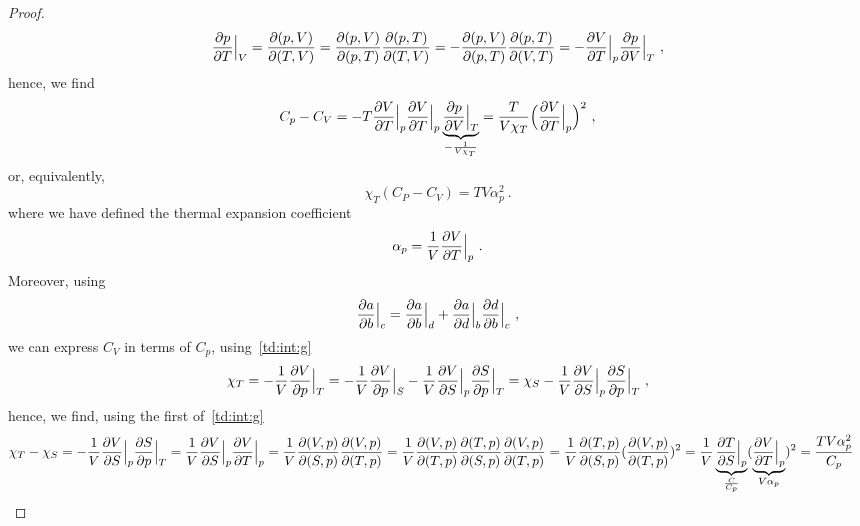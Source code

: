 \begin{proof}
\begin{equation*}
            \frac{\partial p}{\partial T} \Big \vert_V = \frac{\partial(p, V)}{\partial(T, V)} = \frac{\partial(p,V)}{\partial(p, T)} \frac{\partial(p, T)}{\partial(T, V)} = - \frac{\partial(p,V)}{\partial(p, T)} \frac{\partial(p, T)}{\partial(V, T)} = - \frac{\partial V}{\partial T} \Big \vert_p \frac{\partial p}{\partial V} \Big \vert_T ~,
        \end{equation*}
        hence, we find
        \begin{equation*}
            C_p - C_V = - T \frac{\partial V}{\partial T} \Big \vert_p \frac{\partial V}{\partial T} \Big \vert_p \underbrace{\frac{\partial p}{\partial V} \Big \vert_T}_{- \frac{1}{V \chi_T}} = \frac{T}{V \chi_T} \Big ( \frac{\partial V}{\partial T} \Big \vert_p \Big)^2 ~,
        \end{equation*}
        or, equivalently,
        \begin{equation*}
            \chi_T (C_P - C_V) = T V \alpha_p^2 ~.
        \end{equation*}
        where we have defined the thermal expansion coefficient
         \begin{equation}
            \alpha_p = \frac{1}{V} \frac{\partial V}{\partial T} \Big \vert_p ~.
        \end{equation}
        Moreover, using
        \begin{equation*}
            \frac{\partial a}{\partial b} \Big \vert_c = \frac{\partial a}{\partial b} \Big \vert_d + \frac{\partial a}{\partial d} \Big \vert_b \frac{\partial d}{\partial b} \Big \vert_c ~,
        \end{equation*}
        we can express $C_V$ in terms of $C_p$, using~\eqref{td:int:g} 
        \begin{equation*}
            \chi_T = - \frac{1}{V} \frac{\partial V}{\partial p} \Big \vert_T = - \frac{1}{V} \frac{\partial V}{\partial p} \Big \vert_S - \frac{1}{V} \frac{\partial V}{\partial S} \Big \vert_p \frac{\partial S}{\partial p} \Big \vert_T = \chi_S - \frac{1}{V} \frac{\partial V}{\partial S} \Big \vert_p \frac{\partial S}{\partial p} \Big \vert_T ~,
        \end{equation*}
        hence, we find, using the first of~\eqref{td:int:g}
        \begin{equation*}
        \begin{aligned}
            \chi_T - \chi_S & = - \frac{1}{V} \frac{\partial V}{\partial S} \Big \vert_p \frac{\partial S}{\partial p} \Big \vert_T = \frac{1}{V} \frac{\partial V}{\partial S} \Big \vert_p \frac{\partial V}{\partial T} \Big \vert_p = \frac{1}{V} \frac{\partial(V, p)}{\partial(S, p)} \frac{\partial(V, p)}{\partial(T, p)} = \frac{1}{V} \frac{\partial(V, p)}{\partial(T, p)} \frac{\partial(T, p)}{\partial(S, p)} \frac{\partial(V, p)}{\partial(T, p)} = \frac{1}{V} \frac{\partial(T, p)}{\partial(S, p)} (\frac{\partial(V, p)}{\partial(T, p)})^2 = \frac{1}{V} \underbrace{\frac{\partial T}{\partial S} \Big \vert_p}_{\frac{C}{C_p}} (\underbrace{\frac{\partial V}{\partial T} \Big \vert_p}_{V \alpha_p})^2 = \frac{T V \alpha_p^2}{C_p} 
        \end{aligned}
        \end{equation*}

\end{proof}
